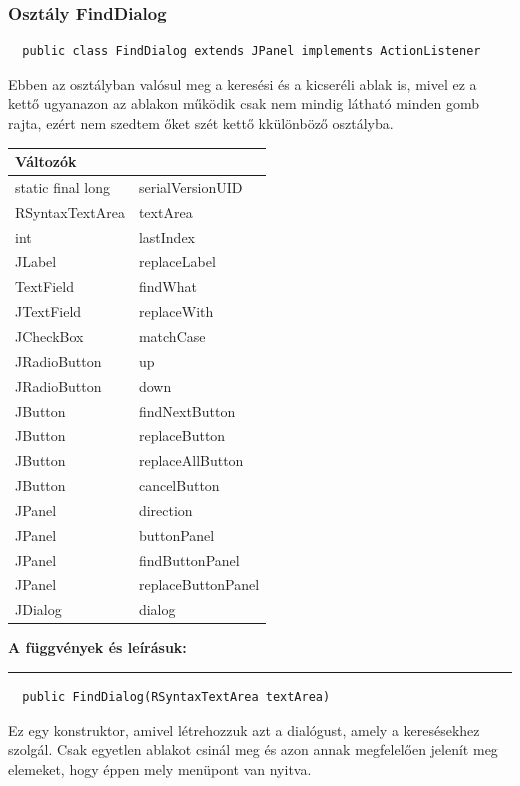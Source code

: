 \documentclass[12pt]{article}
\newcommand{\fuggveny}{\textbf{A függvények és leírásuk: \\}}
\newcommand{\vonal}{\noindent\rule{\textwidth}{1pt}}
\begin{document}
\subsubsection*{Osztály FindDialog}
\begin{lstlisting}
  public class FindDialog extends JPanel implements ActionListener
\end{lstlisting}
Ebben az osztályban valósul meg a keresési és a kicseréli ablak is, mivel ez
a kettő ugyanazon az ablakon működik csak nem mindig látható minden gomb rajta,
ezért nem szedtem őket szét kettő kkülönböző osztályba.
\begin{longtable}{|p{5cm}|p{10cm}|} \hline
    \multicolumn{2}{|p{15cm}|}{\textbf{Változók}}  \\ \hline
    static final long & serialVersionUID \\ \hline
  	RSyntaxTextArea & textArea \\ \hline
  	int & lastIndex \\ \hline
  	JLabel & replaceLabel \\ \hline
  	TextField & findWhat \\ \hline
  	JTextField & replaceWith \\ \hline
  	JCheckBox & matchCase \\ \hline
  	JRadioButton & up \\ \hline
    JRadioButton & down \\ \hline
  	JButton & findNextButton \\ \hline
    JButton & replaceButton \\ \hline
    JButton & replaceAllButton \\ \hline
    JButton & cancelButton \\ \hline
  	JPanel & direction \\ \hline
    JPanel & buttonPanel \\ \hline
    JPanel & findButtonPanel \\ \hline
    JPanel & replaceButtonPanel \\ \hline
  	JDialog & dialog \\ \hline
\end{longtable}

\fuggveny
\vonal
\begin{lstlisting}
  public FindDialog(RSyntaxTextArea textArea)
\end{lstlisting}
Ez egy konstruktor, amivel létrehozzuk azt a dialógust, amely a keresésekhez
szolgál. Csak egyetlen ablakot csinál meg és azon annak megfelelően jelenít meg
elemeket, hogy éppen mely menüpont van nyitva.
\end{document}
